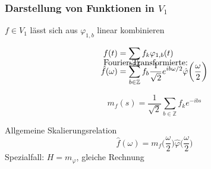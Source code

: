 %
%
%

\begin{frame}
\frametitle{Darstellung von Funktionen in $V_1$}

\begin{block}{$f\in V_1$ lässt sich aus $\varphi_{1,b}$ linear kombinieren}
\vspace{-20pt}

\begin{align*}
f(t)
&=
\sum_{b\in\mathbb Z} f_k \varphi_{1,b}(t)
\\[-15pt]
\intertext{\vspace{-10pt} Fourier-Transformierte:}
\hat{f}(\omega)
&=
\sum_{b\in\mathbb Z} f_b\frac{1}{\sqrt{2}} e^{ib\omega/2}
\hat{\varphi}\biggl(\frac{\omega}2\biggr)
\end{align*}
\end{block}

\vspace{-15pt}

\begin{definition}
\vspace{-10pt}
\[
m_f(s)
=
\frac{1}{\sqrt{2}}
\sum_{b\in\mathbb Z} f_k e^{-ibs}
\]
\end{definition}

\vspace{-15pt}

\begin{block}{Allgemeine Skalierungsrelation}
\vspace{-10pt}
\[
\hat{f}(\omega)
=
m_f\biggl(\frac{\omega}2\biggr)
\hat{\varphi}\biggl(\frac{\omega}2\biggr)
\]
Spezialfall: $H=m_\varphi$, gleiche Rechnung
\end{block}

\end{frame}

